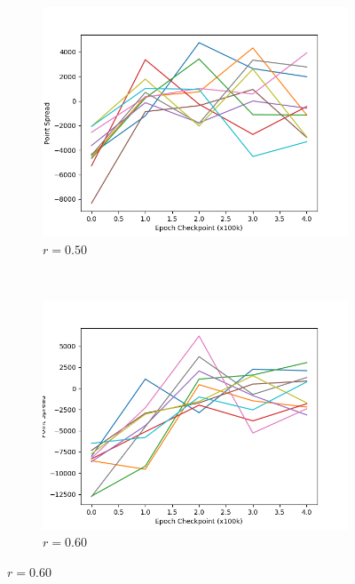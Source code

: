 
\begin{figure}

	\begin{subfigure}[t]{0.48\textwidth}
		\center
		\includegraphics[width=\textwidth]{images/findings/experiments/regularization/tourny/reg_050-kyttuhat-strict-500k.png}
		\caption{$r = 0.50$}
	\end{subfigure}
	~
	\begin{subfigure}[t]{0.48\textwidth}
		\center
		\includegraphics[width=\textwidth]{images/findings/experiments/regularization/tourny/reg_060-kyttuhat-strict-500k.png}
		\caption{$r = 0.60$}
	\end{subfigure}


\end{figure}
